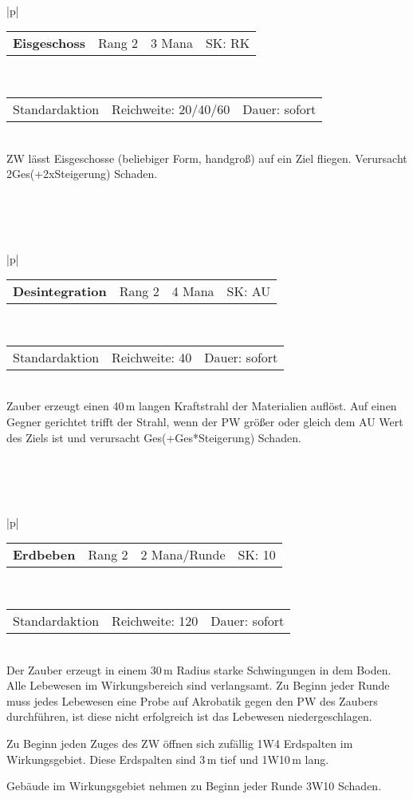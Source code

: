 \documentclass[../../Heldenanleitung2]{subfiles}
\begin{document}
\\\\\\
\begin{tabular}{|p{\textwidth}|}
\hline
\begin{tabularx}{\textwidth}{X|X|X|X}
\textbf{Eisgeschoss} & Rang 2 & 3 Mana & SK: RK
\end{tabularx} \\ \hline
\begin{tabularx}{\textwidth}{X|X|X}
Standardaktion & Reichweite: 20/40/60 & Dauer: sofort
\end{tabularx} \\ \hline
ZW lässt Eisgeschosse (beliebiger Form, handgroß) auf ein Ziel fliegen. Verursacht 2Ges(+2xSteigerung) Schaden.
\\ \hline
\end{tabular}
\\\\\\
\begin{tabular}{|p{\textwidth}|}
\hline
\begin{tabularx}{\textwidth}{X|X|X|X}
\textbf{Desintegration} & Rang 2 & 4 Mana & SK: AU
\end{tabularx} \\ \hline
\begin{tabularx}{\textwidth}{X|X|X}
Standardaktion & Reichweite: 40 & Dauer: sofort
\end{tabularx} \\ \hline
Zauber erzeugt einen 40\,m langen Kraftstrahl der Materialien auflöst. Auf einen Gegner gerichtet trifft der Strahl, wenn der PW größer oder gleich dem AU Wert des Ziels ist und verursacht Ges(+Ges*Steigerung) Schaden.
\\ \hline
\end{tabular}
\\\\\\
\begin{tabular}{|p{\textwidth}|}
\hline
\begin{tabularx}{\textwidth}{X|X|X|X}
\textbf{Erdbeben} & Rang 2 & 2 Mana/Runde & SK: 10
\end{tabularx} \\ \hline
\begin{tabularx}{\textwidth}{X|X|X}
Standardaktion & Reichweite: 120 & Dauer: sofort
\end{tabularx} \\ \hline
Der Zauber erzeugt in einem 30\,m Radius starke Schwingungen in dem Boden. Alle Lebewesen im Wirkungsbereich sind verlangsamt. Zu Beginn jeder Runde muss jedes Lebewesen eine Probe auf Akrobatik gegen den PW des Zaubers durchführen, ist diese nicht erfolgreich ist das Lebewesen niedergeschlagen.

Zu Beginn jeden Zuges des ZW öffnen sich zufällig 1W4 Erdspalten im Wirkungsgebiet. Diese Erdspalten sind 3\,m tief und 1W10\,m lang.

Gebäude im Wirkungsgebiet nehmen zu Beginn jeder Runde 3W10 Schaden.
\\ \hline
\end{tabular}
\end{document}
